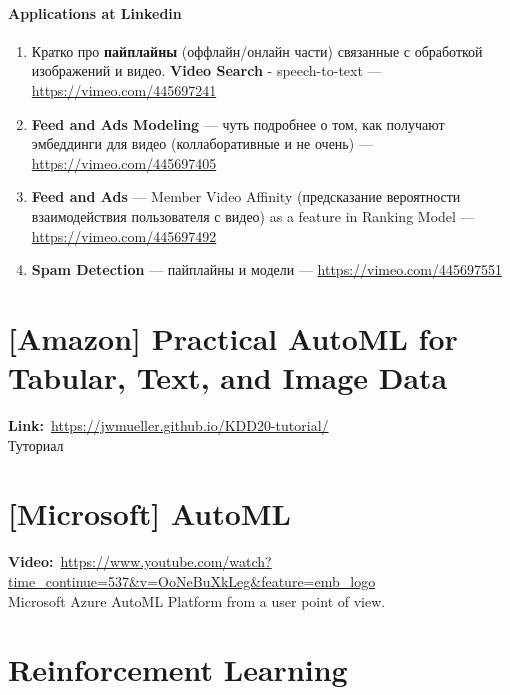 \paragraph{Applications at Linkedin}

\begin{enumerate}
    \item Кратко про \textbf{пайплайны} (оффлайн/онлайн части) связанные с обработкой изображений и видео. \textbf{Video Search} - speech-to-text --- \url{https://vimeo.com/445697241}
    \item \textbf{Feed and Ads Modeling} --- чуть подробнее о том, как получают эмбеддинги для видео (коллаборативные и не очень) --- \url{https://vimeo.com/445697405}
    \item \textbf{Feed and Ads} --- Member Video Affinity (предсказание вероятности взаимодействия пользователя с видео) as a feature in Ranking Model --- \url{https://vimeo.com/445697492}
    \item \textbf{Spam Detection} --- пайплайны и модели --- \url{https://vimeo.com/445697551}
\end{enumerate}


\section*{[Amazon] Practical AutoML for Tabular, Text, and Image Data}

\textbf{Link:}~\url{https://jwmueller.github.io/KDD20-tutorial/} \\

Туториал


\section*{[Microsoft] AutoML}
\textbf{Video:}~\url{https://www.youtube.com/watch?time_continue=537&v=OoNeBuXkLeg&feature=emb_logo} \\

Microsoft Azure AutoML Platform from a user point of view.


\section*{Reinforcement Learning}

